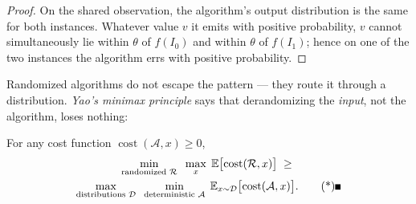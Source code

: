 \begin{proof}
On the shared observation, the algorithm's output distribution is the same for both instances.
Whatever value $v$ it emits with positive probability, $v$ cannot simultaneously lie within
$\theta$ of $f(I_0)$ and within $\theta$ of $f(I_1)$; hence on one of the two instances the
algorithm errs with positive probability.
\end{proof}

\begin{widefigure}[t]
\centering
{}
\caption{The two-instance pattern: the adversary plants instances that every procedure in the
model must observe identically, while the demanded answers differ by more than the tolerance.
Dynamic settings (Section~\ref{sec:adv-bicore}) use the same picture with $I_0, I_1$ two
futures of an update stream and $\tau$ the data structure's state.}
\label{fig:adv-twoinstance}
\end{widefigure}


Randomized algorithms do not escape the pattern --- they route it through a distribution.
\emph{Yao's minimax principle} \citep{adversarial-construction-bg1} says that derandomizing the
\emph{input}, not the algorithm, loses nothing:

\begin{theorem}\label{thm:adv-yao}
For any cost function $\operatorname{cost}(\mathcal{A}, x) \ge 0$,
\begin{gather*}
\min_{\text{randomized } \mathcal{R}}\;\; \max_{x}\;
  \mathbb{E}\bigl[\operatorname{cost}(\mathcal{R}, x)\bigr]
\;\ge\;\\
\max_{\text{distributions } \mathcal{D}}\;\; \min_{\text{deterministic } \mathcal{A}}\;
  \mathbb{E}_{x \sim \mathcal{D}}\bigl[\operatorname{cost}(\mathcal{A}, x)\bigr]. \eopm
\end{gather*}
\end{theorem}

